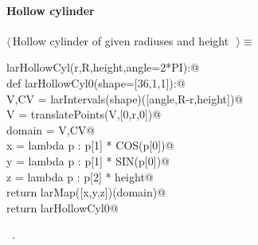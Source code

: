 \documentclass[11pt,oneside]{article}	%
\begin{document}
\paragraph{Hollow cylinder}
\begin{flushleft} \small \label{scrap19}
$\langle\,$Hollow cylinder of given radiuses and height\nobreak\ {\footnotesize {}}$\,\rangle\equiv$
\vspace{-1ex}
\begin{list}{}{} \item
\mbox{}\verb@def larHollowCyl(r,R,height,angle=2*PI):@\\
\mbox{}\verb@   def larHollowCyl0(shape=[36,1,1]):@\\
\mbox{}\verb@      V,CV = larIntervals(shape)([angle,R-r,height])@\\
\mbox{}\verb@      V = translatePoints(V,[0,r,0])@\\
\mbox{}\verb@      domain = V,CV@\\
\mbox{}\verb@      x = lambda p : p[1] * COS(p[0])@\\
\mbox{}\verb@      y = lambda p : p[1] * SIN(p[0])@\\
\mbox{}\verb@      z = lambda p : p[2] * height@\\
\mbox{}\verb@      return larMap([x,y,z])(domain)@\\
\mbox{}\verb@   return larHollowCyl0@\\
\mbox{}\verb@@{\NWsep}
\end{list}
\vspace{-1ex}
\footnotesize\addtolength{\baselineskip}{-1ex}
\begin{list}{}{\setlength{\itemsep}{-\parsep}\setlength{\itemindent}{-\leftmargin}}
\item \NWtxtMacroRefIn\ .
\end{list}
\end{flushleft}
\end{document}
